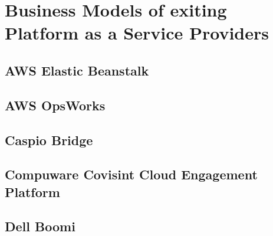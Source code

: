 \chapter{Business Models of exiting Platform as a Service Providers}\label{ch:app01}

\section{AWS Elastic Beanstalk}


\newpage
\section{AWS OpsWorks}


\section{Caspio Bridge}


%

\newpage
\section{Compuware Covisint Cloud Engagement Platform}


\newpage
\section{Dell Boomi}


%

%

